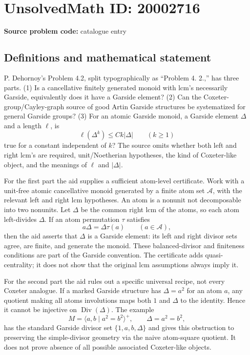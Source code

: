 \documentclass[11pt]{article}
\begin{document}
\section*{UnsolvedMath ID: 20002716}
\textbf{Source problem code:} catalogue entry
\subsection{Definitions and mathematical statement}
P. Dehornoy's Problem 4.2, split typographically as ``Problem 4. 2.,'' has three parts. (1) Is a cancellative finitely generated monoid with lcm's necessarily Garside, equivalently does it have a Garside element? (2) Can the Coxeter-group/Cayley-graph source of good Artin Garside structures be systematized for general Garside groups? (3) For an atomic Garside monoid, a Garside element $\Delta$ and a length $\ell$, is
\[
\ell(\Delta^k)\leq Ck|\Delta|\qquad(k\geq1)
\]
true for a constant independent of $k$? The source omits whether both left and right lcm's are required, unit/Noetherian hypotheses, the kind of Coxeter-like object, and the meanings of $\ell$ and $|\Delta|$.

For the first part the aid supplies a sufficient atom-level certificate. Work with a unit-free atomic cancellative monoid generated by a finite atom set $\mathcal A$, with the relevant left and right lcm hypotheses. An atom is a nonunit not decomposable into two nonunits. Let $\Delta$ be the common right lcm of the atoms, so each atom left-divides $\Delta$. If an atom permutation $\tau$ satisfies
\[
a\Delta=\Delta\tau(a)\qquad(a\in\mathcal A),
\]
then the aid asserts that $\Delta$ is a Garside element: its left and right divisor sets agree, are finite, and generate the monoid. These balanced-divisor and finiteness conditions are part of the Garside convention. The certificate adds quasi-centrality; it does not show that the original lcm assumptions always imply it.

For the second part the aid rules out a specific universal recipe, not every Coxeter analogue. If a marked Garside structure has $\Delta=a^2$ for an atom $a$, any quotient making all atoms involutions maps both $1$ and $\Delta$ to the identity. Hence it cannot be injective on $\operatorname{Div}(\Delta)$. The example
\[
M=\langle a,b\mid a^2=b^2\rangle^+,\qquad\Delta=a^2=b^2,
\]
has the standard Garside divisor set $\{1,a,b,\Delta\}$ and gives this obstruction to preserving the simple-divisor geometry via the naive atom-square quotient. It does not prove absence of all possible associated Coxeter-like objects.
\end{document}
